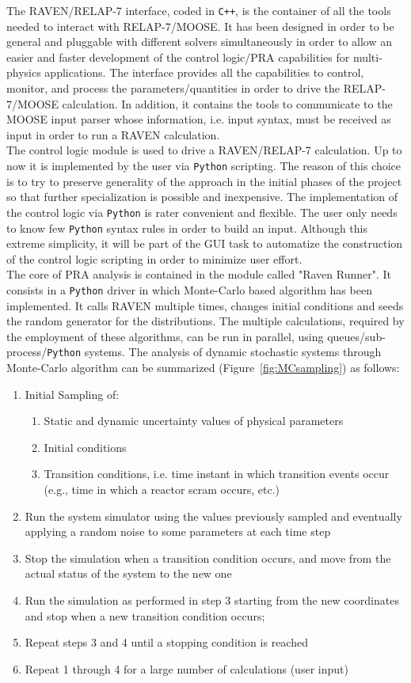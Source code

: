 \documentclass{anstrans}
\begin{document}
The RAVEN/RELAP-7 interface, coded in \verb!C++!, is the container of all the tools needed to interact with RELAP-7/MOOSE. It has been designed in order to be general and pluggable with different solvers simultaneously in order to allow an easier and faster development of the control logic/PRA capabilities for multi-physics applications.
The interface provides all the capabilities to control, monitor, and process the parameters/quantities in order to drive the RELAP-7/MOOSE calculation. In addition, it contains the tools to communicate to the MOOSE input parser whose information, i.e. input syntax, must be received as input in order to run a RAVEN  calculation.\\The control logic module is used to drive a RAVEN/RELAP-7 calculation. Up to now it is implemented by the user via \verb!Python! scripting. The reason of this choice is to try to preserve generality of the approach in the initial phases of the project so that further specialization is possible and  inexpensive. The implementation of the control logic via \verb!Python! is rater convenient and flexible. The user only needs to know few \verb!Python! syntax rules in order to build an input. Although this extreme simplicity, it will be part of the GUI task to automatize the construction of the control logic scripting in order to minimize user effort. 
\\ The core of PRA analysis is contained in the module called "Raven Runner". It consists in a \verb!Python! driver in which Monte-Carlo based algorithm has been implemented. It calls RAVEN multiple times, changes initial conditions and seeds the random generator for the distributions.
The multiple calculations, required by the employment of these algorithms, can be run in parallel, using queues/sub-process/\verb!Python! systems. The analysis of dynamic stochastic systems through Monte-Carlo algorithm can be summarized (Figure~\ref{fig:MCsampling}) as follows:
\begin{enumerate}
\item Initial Sampling of:
       \begin{enumerate}
       \item Static and dynamic uncertainty values of physical parameters
       \item Initial conditions
       \item Transition conditions, i.e. time instant in which transition events occur (e.g., time in which a reactor scram occurs, etc.)
    \end{enumerate}
\item Run the system simulator using the values previously sampled and eventually applying a random noise to some parameters at each time step
\item Stop the simulation when a transition condition occurs, and move from the actual status of the system to the new one
\item Run the simulation as performed in step 3 starting from the new coordinates and stop when a new transition condition occurs;
\item Repeat steps 3 and 4 until a stopping condition is reached
\item Repeat 1 through 4 for a large number of calculations (user input)
\end{enumerate}
\end{document}
